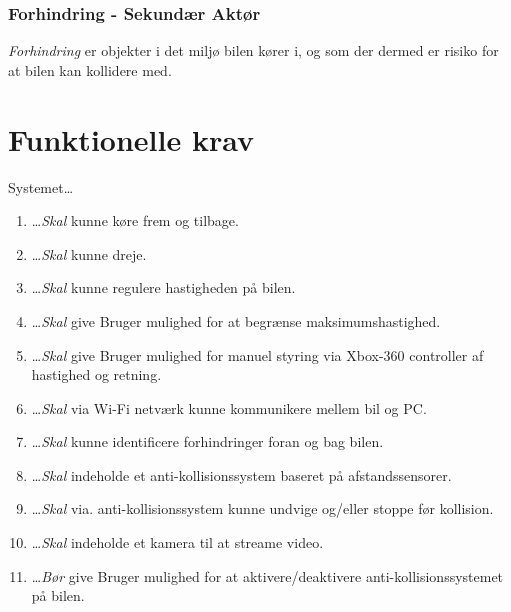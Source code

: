 \subsubsection{Forhindring - Sekundær Aktør}
\textit{Forhindring} er objekter i det miljø bilen kører i, og som der dermed er risiko for at bilen kan kollidere med.  
\clearpage


\section{Funktionelle krav} \label{sec:funktionelle_krav}
Systemet\ldots
\begin{enumerate}\itemsep1pt \parskip0pt 
	\item \ldots  \emph{Skal} kunne køre frem og tilbage.
	\item \ldots  \emph{Skal} kunne dreje.
	\item \ldots  \emph{Skal} kunne regulere hastigheden på bilen.
	\item \ldots  \emph{Skal} give Bruger mulighed for at begrænse maksimumshastighed.
	\item \ldots  \emph{Skal} give Bruger mulighed for manuel styring via Xbox-360 controller af hastighed og retning.
	\item \ldots  \emph{Skal} via Wi-Fi netværk kunne kommunikere mellem bil og PC.
	\item \ldots  \emph{Skal} kunne identificere forhindringer foran og bag bilen.
	\item \ldots  \emph{Skal} indeholde et anti-kollisionssystem baseret på afstandssensorer.
	\item \ldots  \emph{Skal} via. anti-kollisionssystem kunne undvige og/eller stoppe før kollision.
	\item \ldots  \emph{Skal} indeholde et kamera til at streame video.
	\item \ldots  \emph{Bør} give Bruger mulighed for at aktivere/deaktivere anti-kollisionssystemet på bilen.
\end{enumerate}


